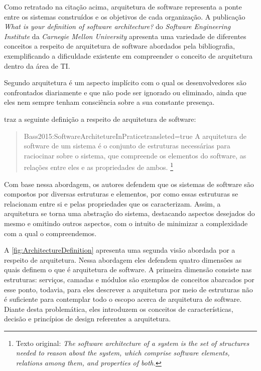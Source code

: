 Como retratado na citação acima, arquitetura de software representa a ponte entre os sistemas
construídos e os objetivos de cada organização. A publicação \textit{What is your definition of
software architecture?} do \textit{Software Engineering Institute} da \textit{Carnegie Mellon
University} \cite{SEI2017:WhatIsYourSoftwareArchitectureDefinition} apresenta uma variedade de diferentes
conceitos a respeito de arquitetura de software abordados pela bibliografia, exemplificando a
dificuldade existente em compreender o conceito de arquitetura dentro da área de \gls{TI}.

Segundo  arquitetura é um aspecto implícito com o qual os desenvolvedores são confrontados
diariamente e que não pode ser ignorado ou eliminado, ainda que eles nem sempre tenham consciência
sobre a sua constante presença.

 traz a seguinte definição a respeito de
arquitetura de software:

\begin{quotation}{Bass2015:SoftwareArchitetureInPratice}{transleted=true}
    A arquitetura de software de um sistema é o conjunto de estruturas necessárias para raciocinar
    sobre o sistema, que compreende os elementos do software, as relações entre eles e as propriedades de ambos.
    \footnote{Texto original: \textit{The software architecture of a system is the set of structures needed to
reason about the system, which comprise software elements, relations
    among them, and properties of both.}}
\end{quotation}

Com base nessa abordagem, os autores defendem que os sistemas de software são compostos por diversas
estruturas e elementos, por como essas estruturas se relacionam entre si e pelas propriedades que os
caracterizam. Assim, a arquitetura se torna uma abstração do sistema, destacando aspectos desejados
do mesmo e omitindo outros aspectos, com o intuito de minimizar a complexidade com a qual o compreendemos.

A \autoref{fig:ArchitectureDefinition} apresenta uma segunda visão abordada por
 a respeito de arquitetura.
Nessa abordagem eles defendem quatro dimensões as quais definem o que é arquitetura de software. A primeira
dimensão consiste nas estruturas: serviços, camadas e módulos são exemplos de conceitos abarcados
por esse ponto, todavia, para eles descrever a arquitetura por meio de estruturas não é suficiente para contemplar
todo o escopo acerca de arquitetura de software. Diante desta problemática, eles introduzem os
conceitos de características, decisão e princípios de design referentes a arquitetura. 

